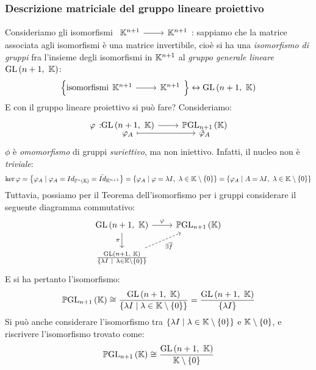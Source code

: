 \subsubsection{Descrizione matriciale del gruppo lineare proiettivo}
Consideriamo gli isomorfismi $\funz{\ }{\kamp^{n+1}}{\kamp^{n+1}}$: sappiamo che la matrice associata agli isomorfismi è una matrice invertibile, cioè si ha una \textit{isomorfismo di gruppi} fra l'insieme degli isomorfismi in $\mathbb{K}^{n+1}$ al \textit{gruppo generale lineare} $\gl\left(n+1,\ \kamp\right)$:
\begin{equation*}
	\left\{\text{isomorfismi}\funz{\ }{\kamp^{n+1}}{\kamp^{n+1}}\right\}\leftrightarrow\gl\left(n+1,\ \kamp\right)
\end{equation*}
E con il gruppo lineare proiettivo si può fare? Consideriamo:
\begin{equation}
	\funztot{\varphi}{\gl\left(n+1,\ \kamp\right)}{\projgl[n+1]{\kamp}}{\phi_A}{\tilde{\phi}_A}
\end{equation}
 $\phi$ è \textit{omomorfismo} di gruppi \textit{suriettivo}, ma non iniettivo. Infatti, il nucleo non è \textit{triviale}:
 \begin{equation*}
 	\ker \varphi=\left\{\phi_A\mid \phi_A=Id_{\proj[n]{\kamp}}=\tilde{Id}_{\kamp^{n+1}}\right\}=\left\{\phi_A\mid \phi=\lambda I,\ \lambda\in\kamp\setminus\left\{0\right\}\right\}=\left\{\phi_A\mid A=\lambda I,\ \lambda\in\kamp\setminus\left\{0\right\}\right\}
 \end{equation*}
Tuttavia, possiamo per il Teorema dell'isomorfismo per i gruppi considerare il seguente diagramma commutativo:
\[\begin{tikzcd}
	{\gl\left(n+1,\ \kamp\right)} & {\projgl[n+1]{\kamp}} \\
	{\frac{\gl\left(n+1,\ \kamp\right)}{\left\{\lambda I\ \mid\ \lambda\in\kamp\setminus\left\{0\right\}\right\}}}
	\arrow["{\pi}"', from=1-1, to=2-1]
	\arrow["{\exists \overline f}"', from=2-1, to=1-2, dashed]
	\arrow["{\varphi}", from=1-1, to=1-2]
\end{tikzcd}\]
E si ha pertanto l'isomorfismo:
\begin{equation*}
	\projgl[n+1]{\kamp}\cong \frac{\gl\left(n+1,\ \kamp\right)}{\left\{\lambda I\mid\lambda\in\kamp\setminus\left\{0\right\}\right\}}=\frac{\gl\left(n+1,\ \kamp\right)}{\left\{\lambda I\right\}}
\end{equation*}
Si può anche considerare l'isomorfismo tra $\left\{\lambda I\mid\lambda\in\mathbb{K}\setminus\left\{0\right\}\right\}$ e $\mathbb{K}\setminus\left\{0\right\}$, e riscrivere l'isomorfismo trovato come:
\begin{equation*}
	\projgl[n+1]{\kamp}\cong \frac{\gl\left(n+1,\ \kamp\right)}{\kamp\setminus\left\{0\right\}}
\end{equation*}


